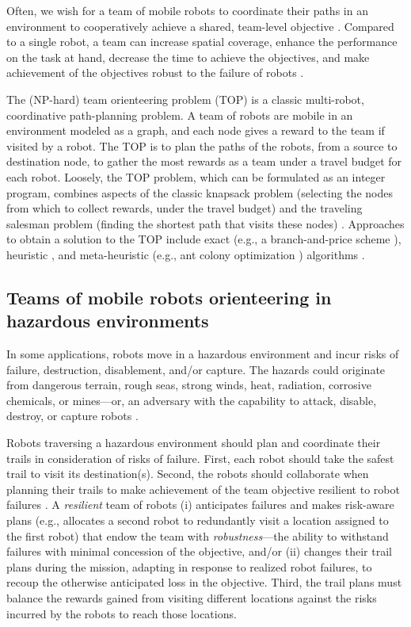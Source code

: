 \documentclass[fleqn,10pt,lineno]{wlpeerj}
\begin{document}
Often, we wish for a team of mobile robots to coordinate their paths in an environment to cooperatively achieve a shared, team-level objective \cite{parker1995design,parker2007distributed}.
Compared to a single robot, a team can increase spatial coverage, enhance the performance on the task at hand, decrease the time to achieve the objectives, and make achievement of the objectives robust to the failure of robots \cite{schranz2020swarm,brambilla2013swarm}.

The (NP-hard) team orienteering \cite{golden1987orienteering} problem (TOP) \cite{chao1996team,gunawan2016orienteering,vansteenwegen2011orienteering} is a classic multi-robot, coordinative path-planning problem.
A team of robots are mobile in an environment modeled as a graph, and each node gives a reward to the team if visited by a robot.
The TOP is to plan the paths of the robots, from a source to destination node, to gather the most rewards as a team under a travel budget for each robot. 
Loosely, the TOP problem, which can be formulated as an integer program, combines aspects of the classic knapsack problem (selecting the nodes from which to collect rewards, under the travel budget) and the traveling salesman problem (finding the shortest path that visits these nodes) \cite{vansteenwegen2011orienteering}.
Approaches to obtain a solution to the TOP include exact (e.g., a branch-and-price scheme \cite{boussier2007exact}), heuristic \cite{chao1996team}, and meta-heuristic (e.g., ant colony optimization \cite{ke2008ants}) algorithms \cite{vansteenwegen2011orienteering}. 

\subsection{Teams of mobile robots orienteering in hazardous environments} 
In some applications, robots move in a hazardous environment \cite{trevelyan2016robotics} and incur risks of failure, destruction, disablement, and/or capture. 
The hazards could originate from dangerous terrain, rough seas, strong winds, heat, radiation, corrosive chemicals, or mines---or, an adversary with the capability to attack, disable, destroy, or capture robots \cite{agmon2017robotic}. 

Robots traversing a hazardous environment should plan and coordinate their trails in consideration of risks of failure.
First, each robot should take the safest trail to visit its destination(s). 
Second, the robots should collaborate when planning their trails to make achievement of the team objective resilient to robot failures \cite{zhou2021multi}. 
A \emph{resilient} team of robots \cite{prorok2021beyond}
(i) anticipates failures and makes risk-aware plans (e.g., allocates a second robot to redundantly visit a location assigned to the first robot) that endow the team with \emph{robustness}---the ability to withstand failures with minimal concession of the objective,
and/or
(ii) changes their trail plans during the mission, adapting in response to realized robot failures, to recoup the otherwise anticipated loss in the objective. 
Third, the trail plans must balance the rewards gained from visiting different locations against the risks incurred by the robots to reach those locations.
\end{document}
